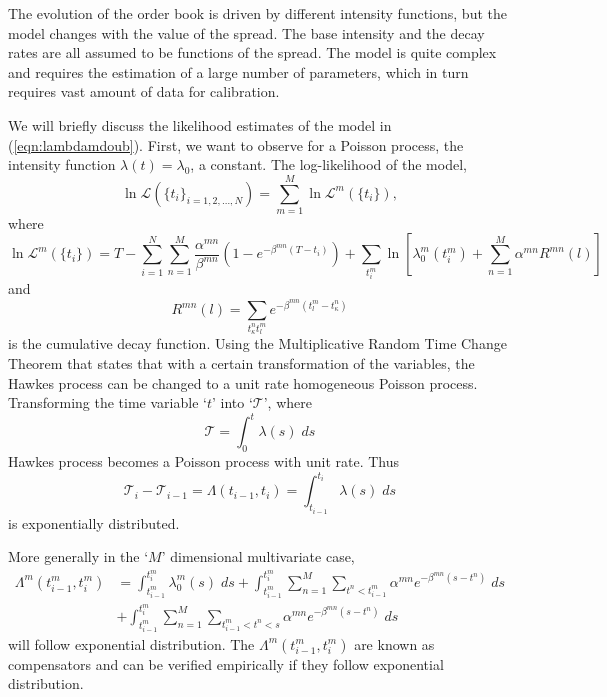 The evolution of the order book is driven by different intensity functions, but the model changes with the value of the spread. The base intensity and the decay rates are all assumed to be functions of the spread. The model is quite complex and requires the estimation of a large number of parameters, which in turn requires vast amount of data for calibration. 


We will briefly discuss the likelihood estimates of the model in (\ref{eqn:lambdamdoub}). First, we want to observe for a Poisson process, the intensity function $\lambda(t)=\lambda_0$, a constant. The log-likelihood of the model,
	\begin{equation}\label{eqn:loglikemod}
	\ln \mathcal{L}(\{t_i\}_{i=1,2,\ldots,N}) = \sum_{m=1}^M \ln \mathcal{L}^m(\{t_i\}),
	\end{equation}
where
	\[
	\ln \mathcal{L}^m(\{t_i\})= T - \sum_{i=1}^N \sum_{n=1}^M \dfrac{\alpha^{mn}}{\beta^{mn}} (1- e^{-\beta^{mn}(T-t_i)}) + \sum_{t_i^m} \ln[ \lambda_0^m(t_i^m) + \sum_{n=1}^M \alpha^{mn} R^{mn}(l) ]
	\]
and 
	\[
	R^{mn}(l)= \sum_{t_\kappa^n t_l^m} e^{-\beta^{mn}(t_l^m-t_\kappa^n)}
	\]
is the cumulative decay function. Using the Multiplicative Random Time Change Theorem that states that with a certain transformation of the variables, the Hawkes process can be changed to a unit rate homogeneous Poisson process. Transforming the time variable `$t$' into `$\mathcal{T}$', where
	\begin{equation}\label{eqn:calt}
	\mathcal{T}= \int_0^t \lambda(s) \; ds
	\end{equation}
Hawkes process becomes a Poisson process with unit rate. Thus
	\begin{equation}\label{eqn:diffcalt}
	\mathcal{T}_i - \mathcal{T}_{i-1}= \Lambda(t_{i-1},t_i) = \int_{t_{i-1}}^{t_i} \lambda(s) \; ds
	\end{equation}
is exponentially distributed. 


More generally in the `$M$' dimensional multivariate case,
	\[
	\begin{split}
	\Lambda^m(t_{i-1}^m,t_i^m)&= \int_{t_{i-1}^m}^{t_i^m} \lambda_0^m(s) \; ds + \int_{t_{i-1}^m}^{t_i^m} \sum_{n=1}^M \sum_{t^n<t_{i-1}^m} \alpha^{mn} e^{-\beta^{mn}(s-t^n)} \; ds \\
	&+ \int_{t_{i-1}^m}^{t_i^m} \sum_{n=1}^M \sum_{t_{i-1}^m<t^n<s} \alpha^{mn} e^{-\beta^{mn}(s-t^n)} \; ds
	\end{split}
	\]
will follow exponential distribution. The $\Lambda^m(t_{i-1}^m,t_i^m)$ are known as compensators and can be verified empirically if they follow exponential distribution. \\


